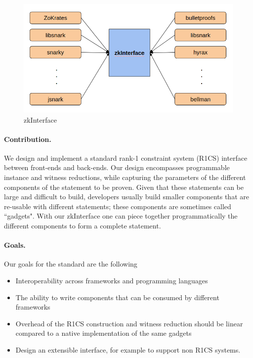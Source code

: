\documentclass[a4paper,11pt]{article}
\begin{document}
		\begin{figure}[h!]
			\includegraphics[width=\linewidth]{interface.png}
			\caption{zkInterface}
			\label{interface}
		\end{figure}

		\paragraph{Contribution.} We design and implement a standard rank-1 constraint system (R1CS) interface between front-ends and back-ends. Our design encompasses programmable instance and witness reductions, while capturing the parameters of the different components of the statement to be proven. Given that these statements can be large and difficult to build, developers usually build smaller components that are re-usable with different statements; these components are sometimes called ``gadgets". With our zkInterface one can piece together programmatically the different components to form a complete statement.
		
		\paragraph{Goals.} Our goals for the standard are the following
		\begin{itemize}
			\item Interoperability across frameworks and programming languages
			\item The ability to write components that can be consumed by different frameworks
			\item Overhead of the R1CS construction and witness reduction should be linear compared to a native implementation of the same gadgets 
			\item Design an extensible interface, for example to support non R1CS systems.
		\end{itemize}
	
\end{document}
